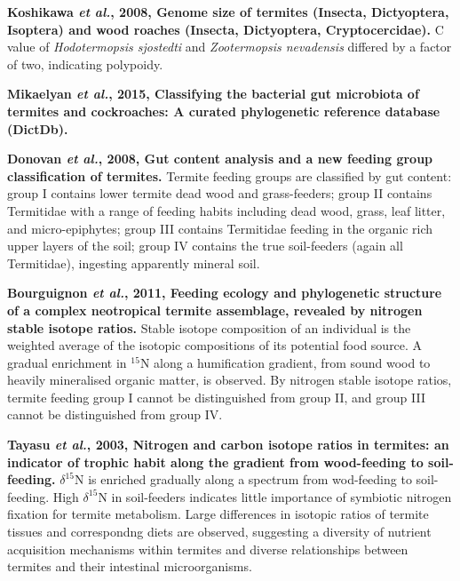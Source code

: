 \documentclass[11pt]{article}
\begin{document}
\begin{sloppypar}
\par
\textbf{Koshikawa \textit{et al.}, 2008, Genome size of termites (Insecta, Dictyoptera, Isoptera) and wood roaches (Insecta, Dictyoptera, Cryptocercidae).} \newline
C value of \textit{Hodotermopsis sjostedti} and \textit{Zootermopsis nevadensis} differed by a factor of two, indicating polypoidy.
\par
\textbf{Mikaelyan \textit{et al.}, 2015, Classifying the bacterial gut microbiota of termites and cockroaches: A curated phylogenetic reference database (DictDb).} \newline
\par
\textbf{Donovan \textit{et al.}, 2008, Gut content analysis and a new feeding group classification of termites.} \newline
Termite feeding groups are classified by gut content: 
group I contains lower termite dead wood and grass-feeders; 
group II contains Termitidae with a range of feeding habits including dead wood, grass, leaf litter, and micro-epiphytes; 
group III contains Termitidae feeding in the organic rich upper layers of the soil; 
group IV contains the true soil-feeders (again all Termitidae), ingesting apparently mineral soil.
\par
\textbf{Bourguignon \textit{et al.}, 2011, Feeding ecology and phylogenetic structure of a complex neotropical termite assemblage, revealed by nitrogen stable isotope ratios.} \newline
Stable isotope composition of an individual is the weighted average of the isotopic compositions of its potential food source. 
A gradual enrichment in $^{15}$N along a humification gradient, from sound wood to heavily mineralised organic matter, is observed. 
By nitrogen stable isotope ratios, termite feeding group I cannot be distinguished from group II, and group III cannot be distinguished from group IV. 
\par
\textbf{Tayasu \textit{et al.}, 2003, Nitrogen and carbon isotope ratios in termites: an indicator of trophic habit along the gradient from wood-feeding to soil-feeding.} \newline
$\delta^{15}$N is enriched gradually along a spectrum from wod-feeding to soil-feeding. 
High $\delta^{15}$N in soil-feeders indicates little importance of symbiotic nitrogen fixation for termite metabolism. 
Large differences in isotopic ratios of termite tissues and correspondng diets are observed, suggesting a diversity of nutrient acquisition mechanisms within termites and diverse relationships between termites and their intestinal microorganisms.

\end{sloppypar}
\end{document}
